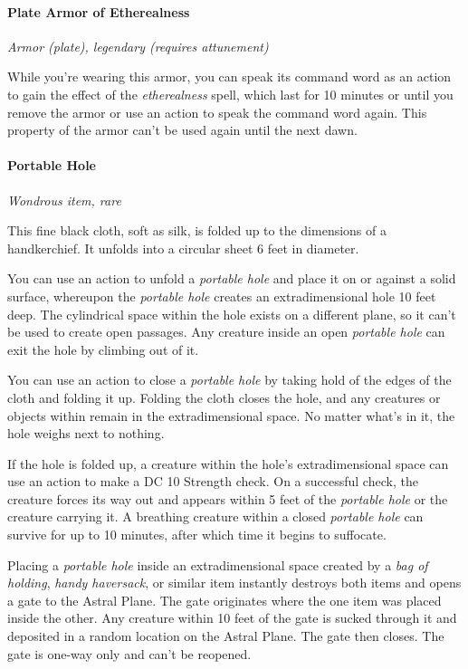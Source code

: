 \documentclass[
]{article}
\begin{document}
\hypertarget{plate-armor-of-etherealness}{%
\paragraph{Plate Armor of
Etherealness}\label{plate-armor-of-etherealness}}

\emph{Armor (plate), legendary (requires attunement)}

While you're wearing this armor, you can speak its command word as an
action to gain the effect of the \emph{etherealness} spell, which last
for 10 minutes or until you remove the armor or use an action to speak
the command word again. This property of the armor can't be used again
until the next dawn.

\hypertarget{portable-hole}{%
\paragraph{Portable Hole}\label{portable-hole}}

\emph{Wondrous item, rare}

This fine black cloth, soft as silk, is folded up to the dimensions of a
handkerchief. It unfolds into a circular sheet 6 feet in diameter.

You can use an action to unfold a \emph{portable hole} and place it on
or against a solid surface, whereupon the \emph{portable hole} creates
an extradimensional hole 10 feet deep. The cylindrical space within the
hole exists on a different plane, so it can't be used to create open
passages. Any creature inside an open \emph{portable hole} can exit the
hole by climbing out of it.

You can use an action to close a \emph{portable hole} by taking hold of
the edges of the cloth and folding it up. Folding the cloth closes the
hole, and any creatures or objects within remain in the extradimensional
space. No matter what's in it, the hole weighs next to nothing.

If the hole is folded up, a creature within the hole's extradimensional
space can use an action to make a DC 10 Strength check. On a successful
check, the creature forces its way out and appears within 5 feet of the
\emph{portable hole} or the creature carrying it. A breathing creature
within a closed \emph{portable hole} can survive for up to 10 minutes,
after which time it begins to suffocate.

Placing a \emph{portable hole} inside an extradimensional space created
by a \emph{bag of holding}, \emph{handy haversack}, or similar item
instantly destroys both items and opens a gate to the Astral Plane. The
gate originates where the one item was placed inside the other. Any
creature within 10 feet of the gate is sucked through it and deposited
in a random location on the Astral Plane. The gate then closes. The gate
is one-way only and can't be reopened.
\end{document}
